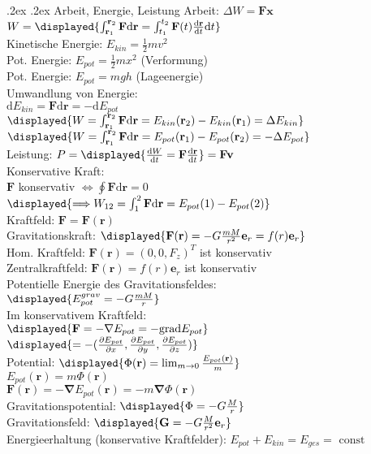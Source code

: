 \documentclass[10pt,landscape,a4paper]{article}
\makeatletter
\renewcommand{\section}{\@startsection{section}{1}{0mm}%
                                {.2ex}%
                                {.2ex}%
                                {\sffamily\small\bfseries}}
\renewcommand{\vec}[1]{\mathbf{#1}}
\newcommand{\implies}{\Longrightarrow}
\newcommand{\grad}{\mathrm{grad}}
\newcommand\const{\text{ const }}
\renewcommand\d{\mathrm{d}}
\renewcommand\v[1]{\vec{#1}}
\makeatother
\begin{document}
\begin{multicols*}{4}
  \section{Arbeit, Energie, Leistung}
  Arbeit: $\Delta W = \v F \v x$ \\
  $W = \displayed{\int_{\v r_1}^{\v r_2} \v F \d \v r = \int_{t_1}^{t_2} \v F(t) \frac{\d \v r}{\d t} \d t}$ \\
  Kinetische Energie: $E_{kin} = \frac{1}{2} mv^2$ \\
  Pot. Energie: $E_{pot} = \frac{1}{2} m x^2$ (Verformung) \\
  Pot. Energie: $E_{pot} = m g h$ (Lageenergie) \\
  Umwandlung von Energie: \\ $\d E_{kin} = \v F\d \v r = -\d E_{pot}$ \\
  $\displayed{W = \int_{\v r_1}^{\v r_2} \v F\d \v r = E_{kin}(\v r_2) - E_{kin}(\v r_1) = \Delta E_{kin}}$ \\
  $\displayed{W = \int_{\v r_1}^{\v r_2} \v F\d \v r = E_{pot}(\v r_1) - E_{pot}(\v r_2) = -\Delta E_{pot}}$ \\
  Leistung: $P = \displayed{\frac{\d W}{\d t} = \v F \frac{\d \v r}{\d t}} = \v F \v v$ \\
  Konservative Kraft: \\
  $\v F$ konservativ $\iff \oint \v F \d \v r = 0$ \\
  $\displayed{\implies W_{12} = \int_1^2 \v F \d\v r = E_{pot}(1) - E_{pot}(2)}$ \\
  Kraftfeld: $\v F = \v F(\v r)$ \\
  Gravitationskraft: $\displayed{\v F(\v r) =  - G\frac{m M}{r^2}\v e_r = f(r) \v e_r}$ \\
  Hom. Kraftfeld: $\v F(\v r) = (0, 0, F_z)^T$ ist konservativ \\
  Zentralkraftfeld: $\v F(\v r) = f(r) \v e_r$ ist konservativ \\
  Potentielle Energie des Gravitationsfeldes: \\ $\displayed{E_{pot}^{grav} = -G \frac{m M}{r}}$ \\
  Im konservativem Kraftfeld: \\ $\displayed{\v F = -\v\nabla E_{pot} = -\grad E_{pot}}$ \\
  $\displayed{= -(\frac{\partial E_{pot}}{\partial x}, \frac{\partial E_{pot}}{\partial y},\frac{\partial E_{pot}}{\partial z})}$ \\
  Potential: $\displayed{\Phi(\v r) = \lim_{m \to 0}\frac{E_{pot}(\v r)}{m}}$ \\
  $E_{pot}(\v r) = m\Phi(\v r)$\\
  $ \v F(\v r) = -\v\nabla E_{pot}(\v r) = -m\v \nabla\Phi(\v r)$ \\
  Gravitationspotential: $\displayed{\Phi = -G \frac{M}{r}}$ \\
  Gravitationsfeld: $\displayed{\v G = -G \frac{M}{r^2}\v e_r}$ \\
  Energieerhaltung (konservative Kraftfelder):
  $E_{pot} + E_{kin} = E_{ges} = \const$

\end{multicols*}
\end{document}
